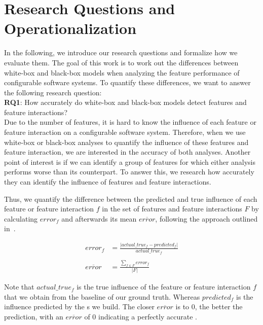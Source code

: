 \section{Research Questions and Operationalization}\label{ch:operationalization}

In the following, we introduce our research questions and formalize how we evaluate them.
The goal of this work is to work out the differences between white-box and black-box models when analyzing the feature performance of configurable
software systems. 
To quantify these differences, we want to answer the following research question:\\

\noindent \textbf{RQ1}: How accurately do white-box and black-box models detect features and feature interactions? \\

Due to the number of features, it is hard to know the influence of each feature or feature interaction on a configurable software system. 
Therefore, when we use white-box or black-box analyses to quantify the influence of these features and feature interaction, 
we are interested in the accuracy of both analyses. 
Another point of interest is if we can identify a group of features for which either analysis performs worse than its counterpart.
To answer this, we research how accurately they can identify the influence of features and feature interactions.

Thus, we quantify the difference between the predicted and true influence of each feature or feature interaction $f$ 
in the set of features and feature interactions $F$ by calculating $error_f$ and afterwards its mean $\overline{error}$, 
following the approach outlined in~\cite{mape}. %


\begin{align}
    error_f &= \frac{\lvert actual\_true_f - predicted_f \rvert}{actual\_true_f} \label{equ:APE_RQ1} \\ \nonumber \\
    \overline{error}  &= \frac{\sum_{f \in F} error_f}{\lvert F \rvert} \label{equ:MAPE_RQ1}
\end{align}

Note that $actual\_true_f$ is the true influence of the feature or feature interaction $f$ that we obtain from the baseline of our ground truth.
Whereas $predicted_f$ is the influence predicted by the {\perfInfluenceModel}s we build.
The closer $\overline{error}$ is to $0$, the better the prediction, with an $\overline{error}$ of 0 indicating a perfectly
accurate \perfInfluenceModel. 

